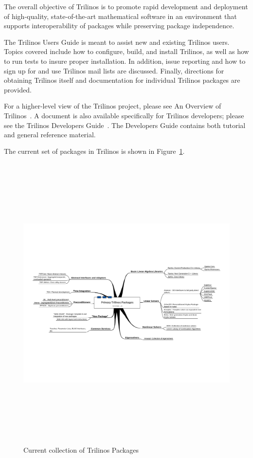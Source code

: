 \documentclass[12pt,relax]{TrilinosUserGuide}
\begin{document}
The overall objective of Trilinos is to promote rapid development and
deployment of high-quality, state-of-the-art mathematical software in
an environment that supports interoperability of packages while
preserving package independence. 

The Trilinos Users Guide is meant to assist new and existing
Trilinos users.  Topics covered include how to configure, build, and install
Trilinos, as well as how to run tests to insure proper installation.  In 
addition, issue reporting and how to sign up for and use Trilinos mail lists 
are discussed.  Finally, directions for obtaining Trilinos itself and 
documentation for individual Trilinos packages are provided.


For a higher-level view of the Trilinos project, please see An Overview
of Trilinos~\cite{Trilinos-Overview}.  A document is also 
available specifically for Trilinos developers; please see the Trilinos 
Developers Guide~\cite{Trilinos-Dev-Guide}.  The Developers Guide contains 
both tutorial and general reference material.  

The current set of packages in Trilinos is shown in 
Figure~\ref{Figure:TrilinosPackages}.

\begin{figure}
\begin{center}
\includegraphics[height=6in,angle=90]{../CommonFiles/TrilinosPackagesDiagram}
\end{center}
\caption{\label{Figure:TrilinosPackages}Current collection of Trilinos Packages}
\end{figure}
\end{document}
